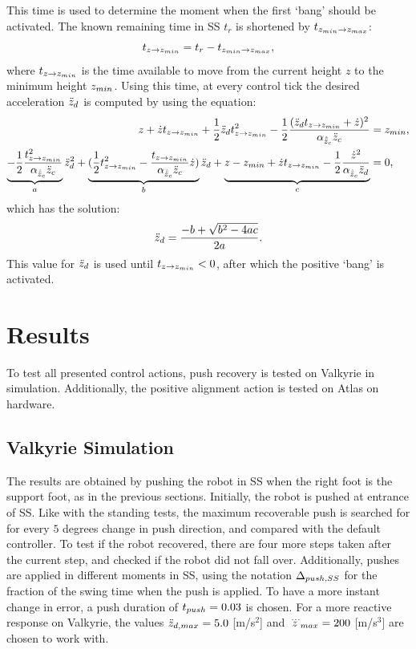 This time is used to determine the moment when the first `bang' should be activated. The known remaining time in \ac{SS} $t_{r}$ is shortened by $ t_{z_{min} \rightarrow z_{max}}$:
\begin{equation}
	t_{z \rightarrow z_{min}} =t_{r} - t_{z_{min} \rightarrow z_{max}},
\end{equation}
where $t_{z \rightarrow z_{min}} $ is the time available to move from the current height $z$ to the minimum height $z_{min}$. Using this time, at every control tick the desired acceleration $\ddot{z}_d$ is computed by using the equation:
\begin{align}
	z + \dot{z}t_{z \rightarrow z_{min}} + \frac{1}{2}\ddot{z}_d t_{z \rightarrow z_{min}}^2 - \frac{1}{2}\frac{(\ddot{z}_d t_{z \rightarrow z_{min}} + \dot{z})^2}{\alpha_{\hat{\ddot{z}}_{c}} \ddot{z}_{c}} &= z_{min}, \\
	\underbrace{-\frac{1}{2}\frac{t_{z \rightarrow z_{min}}^2}{\alpha_{\hat{\ddot{z}}_{c}} \ddot{z}_{c}}}_a \ddot{z}_d^2 + \underbrace{(\frac{1}{2}t_{z \rightarrow z_{min}}^2-\frac{t_{z \rightarrow z_{min}}}{\alpha_{\hat{\ddot{z}}_{c}} \ddot{z}_{c}} \dot{z})}_b \ddot{z}_d + \underbrace{z -z_{min} +\dot{z}t_{z \rightarrow z_{min}} -\frac{1}{2}\frac{\dot{z}^2}{\alpha_{\hat{\ddot{z}}_{c}} \ddot{z}_d}}_c&=0,
\end{align}
which has the solution:
\begin{equation}
 	\ddot{z}_d = \frac{-b + \sqrt{b^2-4ac}}{2a}.
\end{equation}
This value for $\ddot{z}_d$ is used until $t_{z \rightarrow z_{min}}<0$, after which the positive `bang' is activated. 

\section{Results}
To test all presented control actions, push recovery is tested on Valkyrie in simulation. Additionally, the positive alignment action is tested on Atlas on hardware.
\subsection{Valkyrie Simulation}
The results are obtained by pushing the robot in \ac{SS} when the right foot is the support foot, as in the previous sections. Initially, the robot is pushed at entrance of \ac{SS}. Like with the standing tests, the maximum recoverable push is searched for for every $5$ degrees change in push direction, and compared with the default controller. To test if the robot recovered, there are four more steps taken after the current step, and checked if the robot did not fall over. Additionally, pushes are applied in different moments in \ac{SS}, using the notation $\Delta_{push,SS}$ for the fraction of the swing time when the push is applied. To have a more instant change in error, a push duration of $t_{push}=0.03$ is chosen. For a more reactive response on Valkyrie, the values $\ddot{z}_{d,max}=5.0$ [m/s$^2$] and $\dddot{z}_{max}=200$ [m/s$^3$] are chosen to work with.


